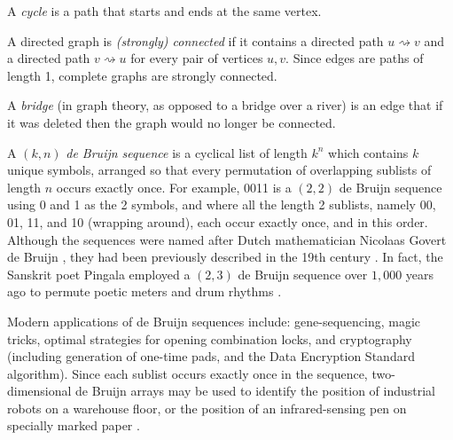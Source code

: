 \documentclass[preprint,times]{elsarticle}
\begin{document}
A \emph{cycle\/} is a path that starts and ends at the same vertex.

A directed graph is \emph{(strongly) connected\/} if it contains a directed path $u \rightsquigarrow v$ and a directed path $v \rightsquigarrow u$ for every pair of vertices $u,v$. Since edges are paths of length 1, complete graphs are strongly connected.

A \emph{bridge}  (in graph theory, as opposed to a bridge over a river) is an edge that if it was deleted then the graph would no longer be connected.


A $(k,n)$ \emph{de Bruijn sequence\/} is a cyclical list of length $k^n$ which contains $k$ unique symbols, arranged so that every permutation of overlapping sublists of length $n$ occurs exactly once. For example, 0011 is a $(2,2)$ de Bruijn sequence using 0 and 1 as the 2 symbols, and where all the length 2 sublists, namely 00, 01, 11, and 10 (wrapping around), each occur exactly once, and in this order.
Although the sequences were named after Dutch mathematician Nicolaas Govert de Bruijn \cite{debruijn}, %
they had been previously described in the  19th century \cite{fleury,sainte-marie}.
In fact, the Sanskrit poet Pingala employed a $(2,3)$ de Bruijn sequence over $1,000$ years ago to permute poetic meters and drum rhythms \cite{hall,knuth4a}. 

Modern applications of de Bruijn sequences include: gene-sequencing, magic tricks, optimal strategies for opening combination locks, and cryptography (including generation of one-time pads, and the Data Encryption Standard algorithm). Since each sublist occurs exactly once in the sequence, two-dimensional de Bruijn arrays may be used to identify the position of industrial robots on a warehouse floor, or the position of an infrared-sensing pen on specially marked paper \cite{diaconis}.
\end{document}
